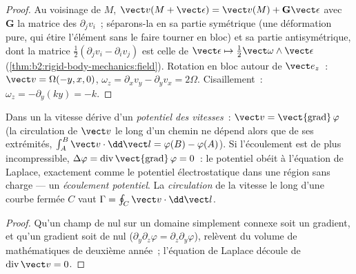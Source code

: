 \begin{proof}
Au voisinage de $M$, $\vect v(M + \vect\epsilon) = \vect v(M) + \mathbf G\vect\epsilon$ avec
$\mathbf G$ la matrice des $\partial_jv_i$~; séparons-la en sa partie symétrique
(une déformation pure, qui étire l'élément sans le faire tourner en
bloc) et sa partie antisymétrique, dont la matrice $\tfrac12(\partial_jv_i -
\partial_iv_j)$ est celle de $\vect\epsilon \mapsto \tfrac12\vect\omega\wedge\vect\epsilon$
(\cref{thm:b2:rigid-body-mechanics:field}). Rotation en bloc autour de $\vect e_z$~:
$\vect v = \Omega(-y, x, 0)$, $\omega_z = \partial_xv_y - \partial_yv_x = 2\Omega$.
Cisaillement~: $\omega_z = -\partial_y(ky) = -k$.
\end{proof}

\begin{definition}\label{def:b2:fluid-kinematics:potential}
Dans un  la vitesse dérive d'un \emph{potentiel
des vitesses}~: $\vect v = \operatorname{\vect{grad}}\varphi$ (la circulation
de $\vect v$ le long d'un chemin ne dépend alors que de ses extrémités, $\int_A^B\vect v
\cdot\dd\vect l = \varphi(B) - \varphi(A)$). Si l'écoulement est de plus
incompressible, $\Delta\varphi = \operatorname{div}\operatorname{\vect{grad}}
\varphi = 0$~: le potentiel obéit à l'équation de Laplace, exactement comme le
potentiel électrostatique dans une région sans charge --- un \emph{écoulement
potentiel}. La \emph{circulation} de la vitesse le long d'une courbe fermée $C$
vaut $\Gamma = \oint_C\vect v\cdot\dd\vect l$.
\end{definition}

\begin{proof}
Qu'un champ de  nul sur un domaine simplement connexe soit un gradient, et
qu'un gradient soit de  nul ($\partial_y\partial_z\varphi = \partial_z\partial_y\varphi$),
relèvent du volume de mathématiques de deuxième année~; l'équation de Laplace découle de
$\operatorname{div}\vect v = 0$.
\end{proof}

